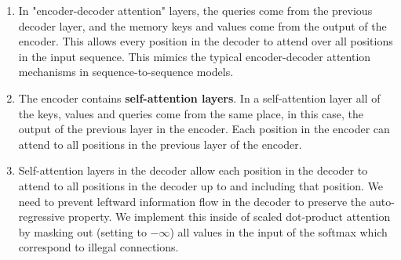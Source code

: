 \begin{enumerate}
    \item In "encoder-decoder attention" layers, the queries come from the previous decoder layer, and the memory keys and values come from the output of the encoder. 
    This allows every position in the decoder to attend over all positions in the input sequence. 
    This mimics the typical encoder-decoder attention mechanisms in sequence-to-sequence models.
    \hfill \cite{arxiv/1706.03762/Attention-Is-All-You-Need}

    \item The encoder contains \textbf{self-attention layers}. 
    In a self-attention layer all of the keys, values and queries come from the same place, in this case, the output of the previous layer in the encoder. 
    Each position in the encoder can attend to all positions in the previous layer of the encoder.
    \hfill \cite{arxiv/1706.03762/Attention-Is-All-You-Need}

    \item Self-attention layers in the decoder allow each position in the decoder to attend to all positions in the decoder up to and including that position. 
    We need to prevent leftward information flow in the decoder to preserve the auto-regressive property. 
    We implement this inside of scaled dot-product attention by masking out (setting to $-\infty$) all values in the input of the softmax which correspond to illegal connections.
    \hfill \cite{arxiv/1706.03762/Attention-Is-All-You-Need}
\end{enumerate}




















